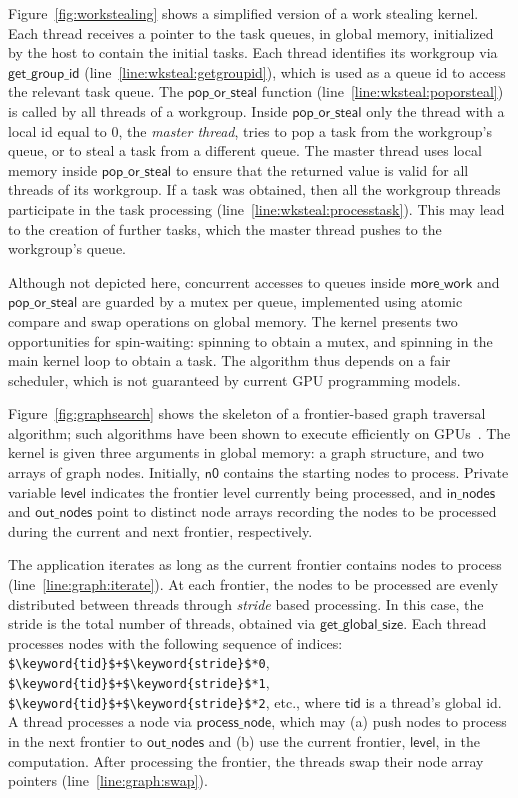 \documentclass[parskip=half,sigconf,review, anonymous=true, acmcopyrightmode=none]{acmart}
\newcommand{\myfiglong}{Figure~}
\newcommand{\code}[1]{\lstset{basicstyle=\tt}\lstinline!#1!\lstset{basicstyle=\scriptsize\tt}}
\newcommand{\getgroupid}{\mathsf{get\_group\_id}}
\newcommand{\getglobalsize}{\mathsf{get\_global\_size}}
\newcommand{\keyword}[1]{\mathsf{#1}}
\begin{document}
\myfiglong\ref{fig:workstealing} shows a simplified version of a work
stealing kernel. Each thread receives a pointer to the
task queues, in global memory, initialized by the
host to contain the initial tasks. Each thread identifies
its workgroup via $\getgroupid$
(line~\ref{line:wksteal:getgroupid}), which is used as a queue id to access the relevant task queue. The
$\mathsf{pop\_or\_steal}$ function (line~\ref{line:wksteal:poporsteal})
is called by all threads of a workgroup.  Inside
$\mathsf{pop\_or\_steal}$ only the thread with a local id equal to $0$,
the \emph{master thread}, tries to pop a
task from the workgroup's queue, or to steal a task from a different
queue. The master thread uses local memory inside
$\mathsf{pop\_or\_steal}$ to ensure that the returned value is valid for
all threads of its workgroup. If a task was obtained, then all the
workgroup threads participate in the task processing (line~\ref{line:wksteal:processtask}).
This may lead to the creation of further tasks, which
the master thread pushes to the workgroup's queue.

Although not depicted here, concurrent accesses to queues inside
$\mathsf{more\_work}$ and $\mathsf{pop\_or\_steal}$ are guarded by a
mutex per queue, implemented using atomic compare and swap operations
on global memory.  The kernel presents two opportunities
for spin-waiting: spinning to obtain a mutex, and spinning in the main
kernel loop to obtain a task.  The algorithm thus depends
on a fair scheduler, which is not guaranteed by current GPU programming models.

 \myfiglong\ref{fig:graphsearch} shows the
skeleton of a frontier-based graph traversal algorithm; such algorithms have
been shown to execute efficiently on GPUs~\cite{BNP12,DBLP:conf/oopsla/PaiP16}. 
The kernel is
given three arguments in global memory: a graph structure, and two
arrays of graph nodes. Initially, $\keyword{n0}$ contains the
starting nodes to process. Private variable $\keyword{level}$ indicates the frontier level currently being
processed, and $\keyword{in\_nodes}$ and $\keyword{out\_nodes}$ point to
distinct node arrays recording the nodes to be processed during the current and next frontier, respectively.

The application iterates as long as the current frontier contains
nodes to process (line~\ref{line:graph:iterate}). At each frontier,
the nodes to be processed are evenly distributed between
threads through \emph{stride} based processing. 
%
In this case, the stride is the total number of threads, obtained via 
$\getglobalsize$.  Each thread processes nodes with the following sequence of indices:
\code{$\keyword{tid}$+$\keyword{stride}$*0},
\code{$\keyword{tid}$+$\keyword{stride}$*1},
\code{$\keyword{tid}$+$\keyword{stride}$*2}, etc., where $\keyword{tid}$ is a thread's global id.
A thread processes a node via $\keyword{process\_node}$, which may (a) push nodes to process in the next frontier to
$\keyword{out\_nodes}$ and (b) use the current frontier, $\keyword{level}$, in
the computation. After processing the frontier, the threads swap their
node array pointers (line~\ref{line:graph:swap}).
\end{document}
